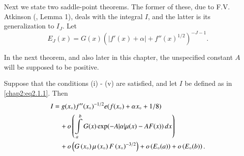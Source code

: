 Next we state two saddle-point theorems. The former of these, due to
F.V. Atkinson (\cite{key2}, Lemma 1), deals with the integral $I$, and
the latter is its generalization to $I_J$. Let 
\begin{equation}\label{chap2:eq2.1.8}
E_J(x)=G(x)\left(\left|f'(x)+\alpha\right|+f''(x)^{1/2}\right)^{-J-1}.
\end{equation}

In the next theorem, and also later in this chapter, the unspecified
constant $A$ will be supposed to be positive.

\begin{thm}\label{chap2:thm2.1}
Suppose that the conditions (i) - (v) are satisfied, and let $I$ be
defined as in \eqref{chap2:eq2.1.1}. Then
\begin{align}
I &= g(x_\circ)f''(x_\circ)^{-1/2}e(f(x_\circ)+\alpha x_\circ
+1/8)\label{chap2:eq2.1.9}\\ 
&\quad +o\left(\int\limits_a^bG(x)\exp(-A|\alpha|\mu(x)-AF(x))
\,dx\right)\notag\\ 
&\quad +o\left(G\left(x_\circ\right)\mu\left(x_\circ\right)F\left(
x_\circ\right)^{-3/2}\right)+o\left(E_\circ(a)\right)+o\left(E_\circ
(b)\right).\notag
\end{align}
\end{thm}

